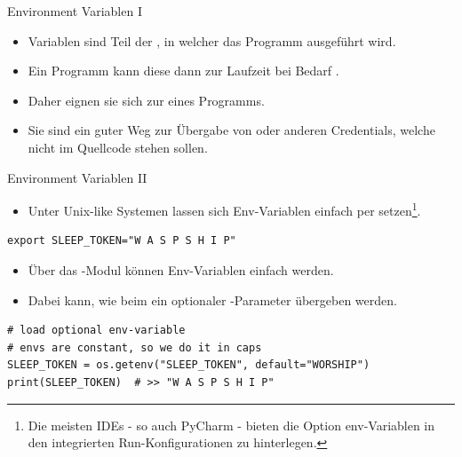 \documentclass[12pt, aspectratio=169, usepdftitle=false]{beamer}
\newcommand{\pp}[1]{\lpl{#1}}
\begin{document}
\begin{frame}[fragile]{Environment Variablen I}
	\begin{itemize}
		\item {} Variablen sind Teil der , in welcher das Programm ausgeführt wird.
		\pause
		\item Ein Programm kann diese dann zur Laufzeit bei Bedarf .
		\pause
		\item Daher eignen sie sich zur  eines Programms.
		\pause
		\item Sie sind ein guter Weg zur Übergabe von  oder anderen Credentials, welche nicht im Quellcode stehen sollen.
		
	\end{itemize}

	
\end{frame}

\begin{frame}[fragile]{Environment Variablen II}
	\begin{itemize}
	\item Unter Unix-like Systemen lassen sich Env-Variablen einfach per  setzen\footnote{Die meisten IDEs - so auch PyCharm - bieten die Option env-Variablen in den integrierten Run-Konfigurationen zu hinterlegen.}.
	\pause
	\end{itemize}
	\begin{lstlisting}[language=pytiny]
export SLEEP_TOKEN="W A S P S H I P" 
	\end{lstlisting}
	
	\pause
	
	\begin{itemize}
		\item Über das \pp{os}-Modul können Env-Variablen einfach  werden.
		\item Dabei kann, wie beim \pp{dict} ein optionaler -Parameter übergeben werden.
	\end{itemize}
	
	\pause
	
	\begin{lstlisting}[language=pytiny]
# load optional env-variable
# envs are constant, so we do it in caps
SLEEP_TOKEN = os.getenv("SLEEP_TOKEN", default="WORSHIP")
print(SLEEP_TOKEN)  # >> "W A S P S H I P" 
	\end{lstlisting}
	
\end{frame}
\end{document}

